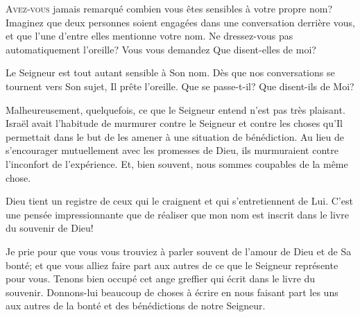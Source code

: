 \dvrule







\lettrine{A}{vez-vous} jamais remarqué combien vous êtes sensibles
 à votre propre nom? Imaginez que deux personnes soient engagées
 dans une conversation derrière vous, et que l'une d'entre elles
 mentionne votre nom. Ne dressez-vous pas automatiquement l'oreille?
 Vous vous demandez\frcolon{}  \Og Que disent-elles de moi? \Fg{}

Le Seigneur est tout autant sensible à Son nom. Dès que nos conversations
 se tournent vers Son sujet, Il prête l'oreille.
 \Og Que se passe-t-il? Que disent-ils de Moi? \Fg{}

Malheureusement, quelquefois, ce que le Seigneur entend n'est pas très
 plaisant. Israël avait l'habitude de murmurer contre le Seigneur
 et contre les choses qu'Il permettait dans le but de les amener
 à une situation de bénédiction. Au lieu de s'encourager mutuellement
 avec les promesses de Dieu, ils murmuraient contre l'inconfort
 de l'expérience. Et, bien souvent, nous sommes coupables de la même chose. 


Dieu tient un registre de ceux qui le craignent et qui s'entretiennent de Lui.
 C'est une pensée impressionnante que de réaliser que mon nom est inscrit
 dans le livre du souvenir de Dieu! 

Je prie pour que vous vous trouviez à parler souvent de l'amour de Dieu
 et de Sa bonté; et que vous alliez faire part aux autres de ce que
 le Seigneur représente pour vous. Tenons bien occupé cet
 \Og ange greffier \Fg{} qui écrit dans le livre du souvenir.
 Donnons-lui beaucoup de choses à écrire en nous faisant part les uns
 aux autres de la bonté et des bénédictions de notre Seigneur. 



